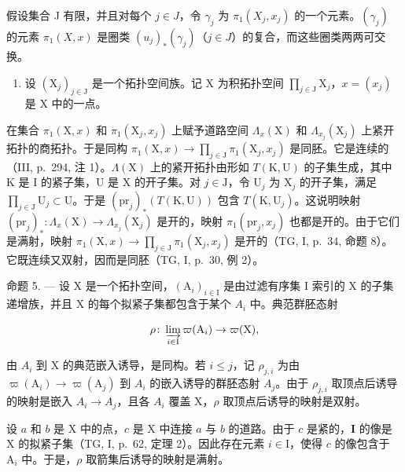 假设集合 J 有限，并且对每个 \(j \in J\)，令 \(\gamma_{j}\) 为 \(\pi_{1}(X_{j}, x_{j})\) 的一个元素。\((\gamma_{j})\) 的元素 \(\pi_{1}(X, x)\) 是圈类 \((u_{j})_{*}(\gamma_{j})\)（\(j \in J\)）的复合，而这些圈类两两可交换。

\begin{enumerate}
\def\labelenumi{\arabic{enumi})}
\setcounter{enumi}{2}
\tightlist
\item
  设 \((\mathrm{X}_j)_{j\in \mathrm{J}}\) 是一个拓扑空间族。记 X 为积拓扑空间 \(\prod_{j\in \mathrm{J}}\mathrm{X}_j\)，\(x = (x_{j})\) 是 X 中的一点。
\end{enumerate}

在集合 \(\pi_1(\mathrm{X},x)\) 和 \(\pi_1(\mathrm{X}_j,x_j)\) 上赋予道路空间 \(\Lambda_x(\mathrm{X})\) 和 \(\Lambda_{x_j}(\mathrm{X}_j)\) 上紧开拓扑的商拓扑。于是同构 \(\pi_1(\mathrm{X},x)\to \prod_{j\in \mathrm{J}}\pi_1(\mathrm{X}_j,x_j)\) 是同胚。它是连续的（III, p.~294, 注 1）。\(\Lambda (\mathrm{X})\) 上的紧开拓扑由形如 \(T(\mathrm{K},\mathrm{U})\) 的子集生成，其中 K 是 I 的紧子集，U 是 X 的开子集。对 \(j\in \mathrm{J}\)，令 \(\mathrm{U}_j\) 为 \(\mathrm{X}_j\) 的开子集，满足 \(\prod_{j\in \mathrm{J}}\mathrm{U}_j\subset \mathrm{U}\)。于是 \((\mathrm{pr}_j)_*(T(\mathrm{K},\mathrm{U}))\) 包含 \(T(\mathrm{K},\mathrm{U}_j)\)。这说明映射 \((\mathrm{pr}_j)_*: \Lambda_x(\mathrm{X})\to \Lambda_{x_j}(\mathrm{X}_j)\) 是开的，映射 \(\pi_1(\mathrm{pr}_j,x_j)\) 也都是开的。由于它们是满射，映射 \(\pi_1(\mathrm{X},x)\to \prod_{j\in \mathrm{J}}\pi_1(\mathrm{X}_j,x_j)\) 是开的（TG, I, p.~34, 命题 8）。它既连续又双射，因而是同胚（TG, I, p.~30, 例 2）。

命题 5. — 设 X 是一个拓扑空间，\((\mathrm{A}_{i})_{i\in\mathrm{I}}\) 是由过滤有序集 I 索引的 X 的子集递增族，并且 X 的每个拟紧子集都包含于某个 \(A_{i}\) 中。典范群胚态射

\[
\rho \colon \varinjlim_ {i \in \mathrm{I}} \varpi (\mathrm{A} _ {i}) \to \varpi (\mathrm{X}),
\]

由 \(A_{i}\) 到 X 的典范嵌入诱导，是同构。若 \(i \leqslant j\)，记 \(\rho_{j,i}\) 为由 \(\varpi(\mathrm{A}_{i}) \to \varpi(\mathrm{A}_{j})\) 到 \(A_{i}\) 的嵌入诱导的群胚态射 \(A_{j}\)。由于 \(\rho_{j,i}\) 取顶点后诱导的映射是嵌入 \(A_{i} \to A_{j}\)，且各 \(A_{i}\) 覆盖 X，\(\rho\) 取顶点后诱导的映射是双射。

设 \(a\) 和 \(b\) 是 X 中的点，\(c\) 是 X 中连接 \(a\) 与 \(b\) 的道路。由于 \(c\) 是紧的，\(\mathbf{I}\) 的像是 X 的拟紧子集（TG, I, p.~62, 定理 2）。因此存在元素 \(i \in \mathrm{I}\)，使得 \(c\) 的像包含于 \(\mathrm{A}_i\) 中。于是，\(\rho\) 取箭集后诱导的映射是满射。

